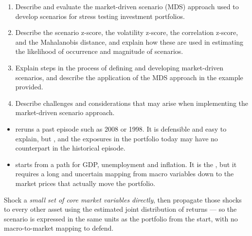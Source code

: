 

\begin{imkeybox}[title={The four objectives in this reading}]
\begin{enumerate}[label=\textbf{\alph*.}]
\item Describe and evaluate the market-driven scenario (MDS) approach used to develop scenarios for stress testing investment portfolios.
\item Describe the scenario z-score, the volatility z-score, the correlation z-score, and the Mahalanobis distance, and explain how these are used in estimating the likelihood of occurrence and magnitude of scenarios.
\item Explain steps in the process of defining and developing market-driven scenarios, and describe the application of the MDS approach in the example provided.
\item Describe challenges and considerations that may arise when implementing the market-driven scenario approach.
\end{enumerate}
\end{imkeybox}


\begin{itemize}
\item {} reruns a past episode such as 2008 or 1998. It is
defensible and easy to explain, but , and the exposures in the portfolio today may have no counterpart in the
historical episode.
\item {} starts from a path for GDP,
unemployment and inflation. It is the , but it requires a
long and uncertain mapping from macro variables down to the market prices that
actually move the portfolio.
\end{itemize}

\begin{imdefbox}[title={What MDS does instead}]
Shock a \emph{small set of core market variables directly}, then propagate those
shocks to every other asset using the estimated joint distribution of returns ---
so the scenario is expressed in the same units as the portfolio from the start,
with no macro-to-market mapping to defend.
\end{imdefbox}

